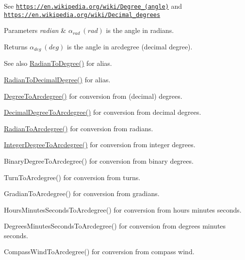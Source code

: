 See \href{https://en.wikipedia.org/wiki/Degree_(angle)}{\tt https\+://en.\+wikipedia.\+org/wiki/\+Degree\+\_\+(angle)} and \href{https://en.wikipedia.org/wiki/Decimal_degrees}{\tt https\+://en.\+wikipedia.\+org/wiki/\+Decimal\+\_\+degrees} 
\begin{DoxyParams}{Parameters}
{\em radian} & $\alpha_{rad}\ (rad)$ is the angle in radians. \\
\hline
\end{DoxyParams}
\begin{DoxyReturn}{Returns}
$\alpha_{deg}\ (deg)$ is the angle in arcdegree (decimal degree). 
\end{DoxyReturn}
\begin{DoxySeeAlso}{See also}
\mbox{\hyperlink{group___e_g_x_math-_angle_conversions-_radian_ga25bbce6cdc1c3621f2a158d320e3bc45}{Radian\+To\+Degree()}} for alias. 

\mbox{\hyperlink{group___e_g_x_math-_angle_conversions-_radian_ga6d170f1882c32de53167c04524d05f67}{Radian\+To\+Decimal\+Degree()}} for alias. 

\mbox{\hyperlink{group___e_g_x_math-_angle_conversions-_degree_gac1b5f3b68f66c77a6df4ceef842c9b19}{Degree\+To\+Arcdegree()}} for conversion from (decimal) degrees. 

\mbox{\hyperlink{group___e_g_x_math-_angle_conversions-_decimal_degree_gacdd463fcabffeb598ebda65b012ce743}{Decimal\+Degree\+To\+Arcdegree()}} for conversion from decimal degrees. 

\mbox{\hyperlink{group___e_g_x_math-_angle_conversions-_radian_ga3dfdc97357cc07f8379976bbc08f9852}{Radian\+To\+Arcdegree()}} for conversion from radians. 

\mbox{\hyperlink{group___e_g_x_math-_angle_conversions-_integer_degree_gaf633d0b82bfb7586ce86ffbcf78d8f7a}{Integer\+Degree\+To\+Arcdegree()}} for conversion from integer degrees. 

Binary\+Degree\+To\+Arcdegree() for conversion from binary degrees. 

Turn\+To\+Arcdegree() for conversion from turns. 

Gradian\+To\+Arcdegree() for conversion from gradians. 

Hours\+Minutes\+Seconds\+To\+Arcdegree() for conversion from hours minutes seconds. 

Degrees\+Minutes\+Seconds\+To\+Arcdegree() for conversion from degrees minutes seconds. 

Compass\+Wind\+To\+Arcdegree() for conversion from compass wind. 
\end{DoxySeeAlso}
\mbox{\label{group___e_g_x_math-_angle_conversions-_radian_ga722e3b8e78540a6b3942b73b64aeb8d2}} 
